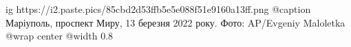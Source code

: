  
 
 
 
 

\ifcmt
  ig https://i2.paste.pics/85cbd2d53ffb5e5e088f51e9160a13ff.png
	@caption Маріуполь, проспект Миру, 13 березня 2022 року. Фото: AP/Evgeniy Maloletka
  @wrap center
  @width 0.8
\fi
